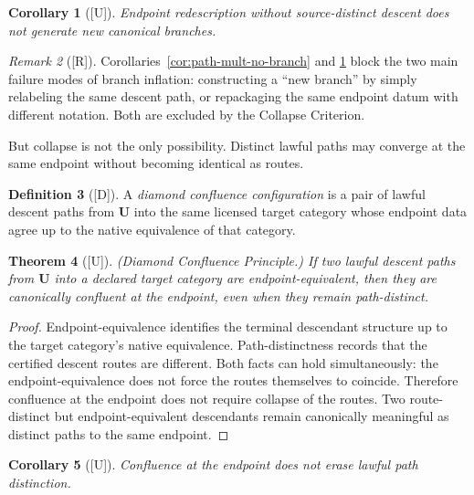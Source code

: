 \documentclass[12pt,oneside]{amsbook}
\theoremstyle{plain}
\newtheorem{theorem}{Theorem}[section]
\newtheorem{corollary}[theorem]{Corollary}
\theoremstyle{definition}
\newtheorem{definition}[theorem]{Definition}
\theoremstyle{remark}
\newtheorem{remark}[theorem]{Remark}
\newcommand{\status}[1]{\textup{[#1]}}
\begin{document}
\begin{corollary}[\status{U}]\label{cor:redescription-no-branch}
Endpoint redescription without source-distinct descent does not
generate new canonical branches.
\end{corollary}

\begin{remark}[\status{R}]\label{rmk:collapse-inflection}
Corollaries~\ref{cor:path-mult-no-branch} and
\ref{cor:redescription-no-branch} block the two main failure modes of
branch inflation: constructing a ``new branch'' by simply relabeling
the same descent path, or repackaging the same endpoint datum with
different notation.  Both are excluded by the Collapse Criterion.
\end{remark}

But collapse is not the only possibility.  Distinct lawful paths may
converge at the same endpoint without becoming identical as routes.

\begin{definition}[\status{D}]\label{def:diamond-confluence}
A \emph{diamond confluence configuration} is a pair of lawful descent
paths from $\mathbf{U}$ into the same licensed target category whose
endpoint data agree up to the native equivalence of that category.
\end{definition}

\begin{theorem}[\status{U}]\label{thm:diamond}
\textup{(Diamond Confluence Principle.)}  If two lawful descent paths
from $\mathbf{U}$ into a declared target category are
endpoint-equivalent, then they are canonically confluent at the
endpoint, even when they remain path-distinct.
\end{theorem}

\begin{proof}
Endpoint-equivalence identifies the terminal descendant structure up to
the target category's native equivalence.  Path-distinctness records
that the certified descent routes are different.  Both facts can hold
simultaneously: the endpoint-equivalence does not force the routes
themselves to coincide.  Therefore confluence at the endpoint does not
require collapse of the routes.  Two route-distinct but
endpoint-equivalent descendants remain canonically meaningful as
distinct paths to the same endpoint.
\end{proof}

\begin{corollary}[\status{U}]\label{cor:confluence-no-collapse}
Confluence at the endpoint does not erase lawful path distinction.
\end{corollary}
\end{document}
